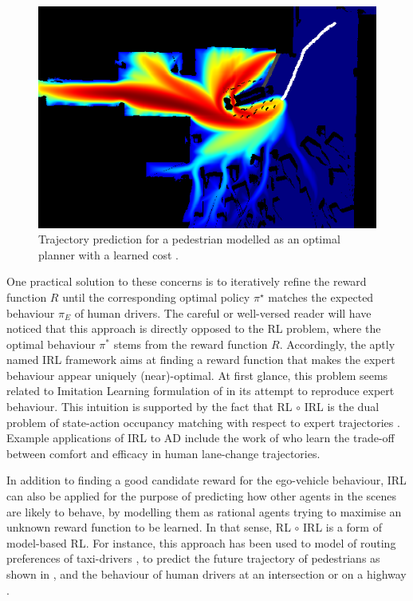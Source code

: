 \begin{figure}[ht]
	\centering
	\includegraphics[width=0.6\linewidth]{img/pedestrian}
	\caption{Trajectory prediction for a pedestrian modelled as an optimal planner with a learned cost \citep{Ziebart2009}.}
	\label{fig:irl-pedestrian}
\end{figure}


One practical solution to these concerns is to iteratively refine the reward function $R$ until the corresponding optimal policy $\pi^\star$ matches the expected behaviour $\pi_E$ of human drivers. The careful or well-versed reader will have noticed that this approach is directly opposed to the \acl*{RL} problem, where the optimal behaviour $\pi^*$ stems from the reward function $R$. Accordingly, the aptly named \ac{IRL} framework aims at finding a reward function that makes the expert behaviour appear uniquely (near)-optimal. At first glance, this problem seems related to Imitation Learning formulation of  in its attempt to reproduce expert behaviour. This intuition is supported by the fact that \ac{RL} $\circ$ \ac{IRL} is the dual problem of state-action occupancy matching with respect to expert trajectories \citep{Ho2016}. Example applications of \ac*{IRL} to \acl*{AD} include the work of \citet{Kuderer2015} who learn the trade-off between comfort and efficacy in human lane-change trajectories. 

In addition to finding a good candidate reward for the ego-vehicle behaviour, \acl*{IRL} can also be applied for the purpose of predicting how other agents in the scenes are likely to behave, by modelling them as rational agents trying to maximise an unknown reward function to be learned. In that sense, \ac{RL} $\circ$ \ac{IRL} is a form of model-based \acl*{RL}.
For instance, this approach has been used to model of routing preferences of taxi-drivers \citep{Ziebart2008}, to predict the future trajectory of pedestrians \citep{Ziebart2009} as shown in , and the behaviour of human drivers at an intersection \citep{Sun2019} or on a highway \citep{Sadigh2016}.


